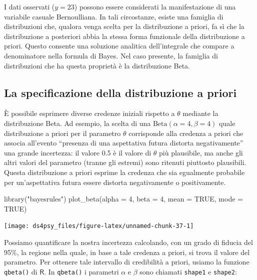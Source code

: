 \documentclass[
  11pt,
]{krantz}
\makeatletter
\newenvironment{Shaded}{\begin{snugshade}}{\end{snugshade}}
\newcommand{\AttributeTok}[1]{\textcolor[rgb]{0.61,0.61,0.61}{#1}}
\newcommand{\ConstantTok}[1]{\textcolor[rgb]{0,0,0}{#1}}
\newcommand{\DecValTok}[1]{\textcolor[rgb]{0.06,0.06,0.06}{#1}}
\newcommand{\FunctionTok}[1]{\textcolor[rgb]{0,0,0}{#1}}
\newcommand{\NormalTok}[1]{#1}
\newcommand{\StringTok}[1]{\textcolor[rgb]{0.5,0.5,0.5}{#1}}
\newenvironment{kframe}{%
\medskip{}
\setlength{\fboxsep}{.8em}
 \def\at@end@of@kframe{}%
 \ifinner\ifhmode%
  \def\at@end@of@kframe{\end{minipage}}%
  \begin{minipage}{\columnwidth}%
 \fi\fi%
 \def\FrameCommand##1{\hskip\@totalleftmargin \hskip-\fboxsep
 \colorbox{shadecolor}{##1}\hskip-\fboxsep
     \hskip-\linewidth \hskip-\@totalleftmargin \hskip\columnwidth}%
 \MakeFramed {\advance\hsize-\width
   \@totalleftmargin\z@ \linewidth\hsize
   \@setminipage}}%
 {\par\unskip\endMakeFramed%
 \at@end@of@kframe}
\renewenvironment{Shaded}{\begin{kframe}}{\end{kframe}}
\newcommand{\R}{\textsf{R}} %
\theoremstyle{definition}
\theoremstyle{definition}
\theoremstyle{definition}
\theoremstyle{definition}
\theoremstyle{remark}
\makeatother
\begin{document}
I dati osservati (\(y = 23\)) possono essere considerati la manifestazione di una variabile casuale Bernoulliana. In tali circostanze, esiste una famiglia di distribuzioni che, qualora venga scelta per la distribuzione a priori, fa sì che la distribuzione a posteriori abbia la stessa forma funzionale della distribuzione a priori. Questo consente una soluzione analitica dell'integrale che compare a denominatore nella formula di Bayes. Nel caso presente, la famiglia di distribuzioni che ha questa proprietà è la distribuzione Beta.

\hypertarget{la-specificazione-della-distribuzione-a-priori}{%
\subsection{La specificazione della distribuzione a priori}\label{la-specificazione-della-distribuzione-a-priori}}

È possibile esprimere diverse credenze iniziali rispetto a \(\theta\) mediante la distribuzione Beta. Ad esempio, la scelta di una \(\mbox{Beta}(\alpha = 4, \beta = 4)\) quale distribuzione a priori per il parametro \(\theta\) corrisponde alla credenza a priori che associa all'evento ``presenza di una aspettativa futura distorta negativamente'' una grande incertezza: il valore 0.5 è il valore di \(\theta\) più plausibile, ma anche gli altri valori del parametro (tranne gli estremi) sono ritenuti piuttosto plausibili. Questa distribuzione a priori esprime la credenza che sia egualmente probabile per un'aspettativa futura essere distorta negativamente o positivamente.

\begin{Shaded}
\begin{Highlighting}[]
\FunctionTok{library}\NormalTok{(}\StringTok{"bayesrules"}\NormalTok{)}
\FunctionTok{plot\_beta}\NormalTok{(}\AttributeTok{alpha =} \DecValTok{4}\NormalTok{, }\AttributeTok{beta =} \DecValTok{4}\NormalTok{, }\AttributeTok{mean =} \ConstantTok{TRUE}\NormalTok{, }\AttributeTok{mode =} \ConstantTok{TRUE}\NormalTok{)}
\end{Highlighting}
\end{Shaded}

\begin{center}\texttt{[image: ds4psy\_files/figure-latex/unnamed-chunk-37-1]} \end{center}

Possiamo quantificare la nostra incertezza calcolando, con un grado di fiducia del 95\%, la regione nella quale, in base a tale credenza a priori, si trova il valore del parametro. Per ottenere tale intervallo di credibilità a priori, usiamo la funzione \texttt{qbeta()} di \(\R\). In \texttt{qbeta()} i parametri \(\alpha\) e \(\beta\) sono chiamati \texttt{shape1} e \texttt{shape2}:
\end{document}
